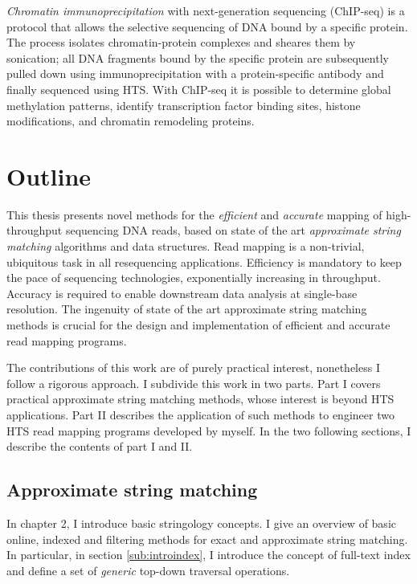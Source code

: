 \emph{Chromatin immunoprecipitation} with next-generation sequencing (ChIP-seq) is a protocol that allows the selective sequencing of DNA bound by a specific protein.
The process isolates chromatin-protein complexes and sheares them by sonication;
all DNA fragments bound by the specific protein are subsequently pulled down using immunoprecipitation with a protein-specific antibody and finally sequenced using HTS.
With ChIP-seq it is possible to determine global methylation patterns, identify transcription factor binding sites, histone modifications, and chromatin remodeling proteins.


\section{Outline}
\label{sec:intro:outline}

This thesis presents novel methods for the \emph{efficient} and \emph{accurate} mapping of high-throughput sequencing DNA reads, based on state of the art \emph{approximate string matching} algorithms and data structures.
Read mapping is a non-trivial, ubiquitous task in all resequencing applications.
Efficiency is mandatory to keep the pace of sequencing technologies, exponentially increasing in throughput.
Accuracy is required to enable downstream data analysis at single-base resolution.
The ingenuity of state of the art approximate string matching methods is crucial for the design and implementation of efficient and accurate read mapping programs.

The contributions of this work are of purely practical interest, nonetheless I follow a rigorous approach.
I subdivide this work in two parts.
Part I covers practical approximate string matching methods, whose interest is beyond HTS applications.
Part II describes the application of such methods to engineer two HTS read mapping programs developed by myself.
In the two following sections, I describe the contents of part I and II.

\subsection{Approximate string matching}

In chapter 2, I introduce basic stringology concepts.
I give an overview of basic online, indexed and filtering methods for exact and approximate string matching.
In particular, in section \ref{sub:introindex}, I introduce the concept of full-text index and define a set of \emph{generic} top-down traversal operations.

